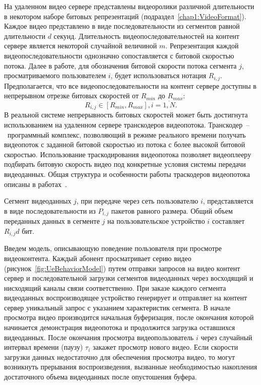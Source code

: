 На удаленном видео сервере представлены видеоролики различной длительности в некотором наборе битовых репрезентаций (подраздел~\ref{chap1:VideoFormat}). Каждое видео представлено в виде последовательности из сегментов равной длительности $d$ секунд. Длительность видеопоследовательностей на контент сервере является некоторой случайной величиной $m$. Репрезентация каждой видеопоследовательности однозначно сопоставляется с битовой скоростью потока. Далее в работе, для обозначения битовой скорости потока сегмента $j$, просматриваемого пользователем $i$, будет использоваться нотация $R_{i,j}$. Предполагается, что все видеопоследовательности на контент сервере доступны в непрерывном отрезке битовых скоростей от $R_{min}$ до $R_{max}$:
\begin{equation}
R_{i,j} \in [R_{min}, R_{max}], i=\overline{1,N}.
\label{eq:BitrateConstr}
\end{equation}
В реальной системе непрерывность битовых скоростей может быть достигнута использованием на удаленном сервере транскодеров видеопотока. Транскодер~--~программный комплекс, позволяющий в режиме реального времени получать видеопоток с заданной битовой скоростью из потока с более высокой битовой скоростью. Использование траскодирования видеопотока позволяет видеоплееру подбирать битовую скорость видео под конкретные условия системы передачи видеоданных. Общая структура и особенности работы траскодеров видеопотока описаны в работах~\cite{1184336,1369700}.

Сегмент видеоданных $j$, при передаче через сеть пользователю $i$, представляется в виде последовательности из $P_{i,j}$ пакетов равного размера. Общий объем переданных данных в сегменте $j$ на пользовательское устройство $i$ составляет $R_{i,j} d$ бит.

Введем модель, описывающую поведение пользователя при просмотре видеоконтента. Каждый абонент просматривает серию видео (рисунок~\ref{fig:UeBehaviorModel}) путем отправки запросов на видео контент сервер и последовательной загрузки сегментов видеоданных через восходящий и нисходящий каналы связи соответственно. При заказе каждого сегмента видеоданных воспроизводящее устройство генерирует и отправляет на контент сервер уникальный запрос с указанием характеристик сегмента. В начале просмотра видео производится начальная буферизация, после окончания которой начинается демонстрация видеопотока и продолжится загрузка оставшихся видеоданных. После окончания просмотра видеопользователь $i$ через случайный интервал времени (паузу) $\tau_i$ закажет просмотр нового видео. Если скорости загрузки данных недостаточно для обеспечения просмотра видео, то могут возникнуть прерывания воспроизведения, вызванные необходимостью накопления достаточного объема видеоданных после опустошения буфера.

